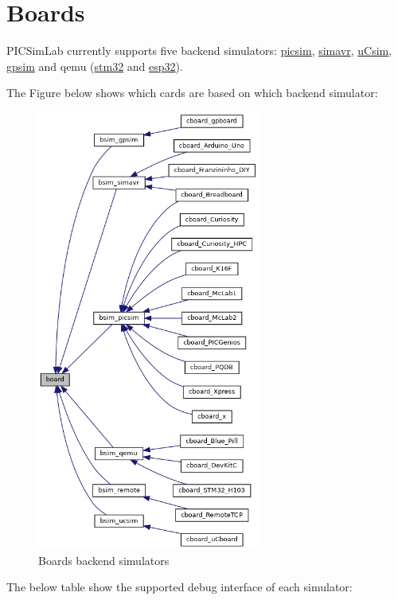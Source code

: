 \chapter{Boards} \hypertarget{def:boards}{}

PICSimLab currently supports five backend simulators:
\href{https://github.com/lcgamboa/picsim}{picsim},  
\href{https://github.com/buserror/simavr}{simavr}, 
\href{http://mazsola.iit.uni-miskolc.hu/\%7edrdani/embedded/ucsim/}{uCsim}, 
\href{http://gpsim.sourceforge.net/}{gpsim} and 
qemu (\href{https://beckus.github.io/qemu_stm32/}{stm32} and \href{https://github.com/a159x36/qemu}{esp32}).

The Figure below shows which cards are based on which backend simulator:

\begin{figure}[H] 
\center
\includegraphics[width=0.65\textwidth]{img/boards.png} 
\caption{Boards backend simulators}
\end{figure} 

The below table show the supported debug interface of each simulator:

